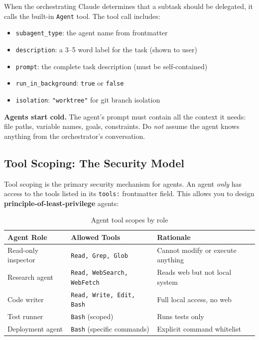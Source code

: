 \documentclass[11pt,letterpaper]{article}
\begin{document}
When the orchestrating Claude determines that a subtask should be delegated, it calls the built-in \texttt{Agent} tool. The tool call includes:

\begin{itemize}[leftmargin=*]
    \item \texttt{subagent\_type}: the agent name from frontmatter
    \item \texttt{description}: a 3--5 word label for the task (shown to user)
    \item \texttt{prompt}: the complete task description (must be self-contained)
    \item \texttt{run\_in\_background}: \texttt{true} or \texttt{false}
    \item \texttt{isolation}: \texttt{"worktree"} for git branch isolation
\end{itemize}

\begin{notebox}
\textbf{Agents start cold.} The agent's prompt must contain all the context it needs: file paths, variable names, goals, constraints. Do \emph{not} assume the agent knows anything from the orchestrator's conversation.
\end{notebox}

\subsection{Tool Scoping: The Security Model}

Tool scoping is the primary security mechanism for agents. An agent \emph{only} has access to the tools listed in its \texttt{tools:} frontmatter field. This allows you to design \textbf{principle-of-least-privilege} agents:

\begin{table}[H]
\centering
\caption{Agent tool scopes by role}
\begin{tabular}{@{}lll@{}}
\toprule
\textbf{Agent Role} & \textbf{Allowed Tools} & \textbf{Rationale} \\
\midrule
Read-only inspector & \texttt{Read, Grep, Glob} & Cannot modify or execute anything \\
Research agent & \texttt{Read, WebSearch, WebFetch} & Reads web but not local system \\
Code writer & \texttt{Read, Write, Edit, Bash} & Full local access, no web \\
Test runner & \texttt{Bash} (scoped) & Runs tests only \\
Deployment agent & \texttt{Bash} (specific commands) & Explicit command whitelist \\
\bottomrule
\end{tabular}
\end{table}
\end{document}
